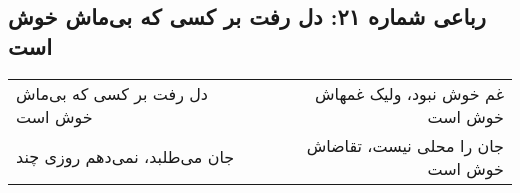 \begin{center}
\section*{رباعی شماره ۲۱: دل رفت بر کسی که بی‌ماش خوش است}
\label{sec:021}
\begin{longtable}{l p{0.5cm} r}
دل رفت بر کسی که بی‌ماش خوش است
&&
غم خوش نبود، ولیک غمهاش خوش است
\\
جان می‌طلبد، نمی‌دهم روزی چند
&&
جان را محلی نیست، تقاضاش خوش است
\\
\end{longtable}
\end{center}
